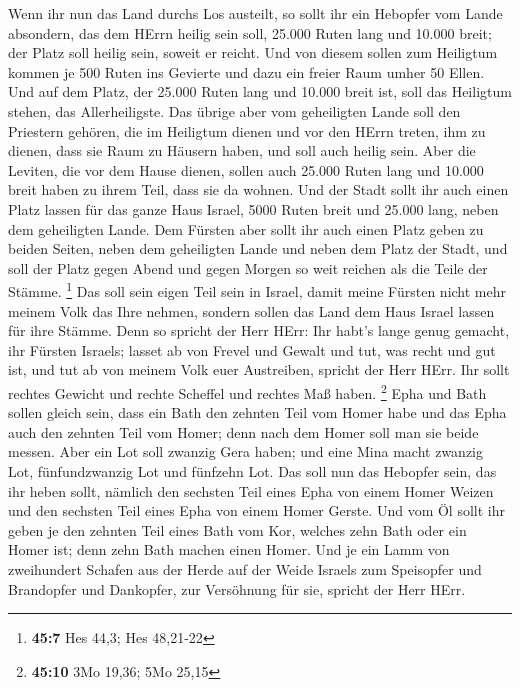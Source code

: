  Wenn ihr nun das Land durchs Los austeilt, so sollt ihr
ein Hebopfer vom Lande absondern, das dem HErrn heilig sein soll, 25.000
Ruten lang und 10.000 breit; der Platz soll heilig sein, soweit er
reicht.  Und von diesem sollen zum Heiligtum kommen je 500
Ruten ins Gevierte und dazu ein freier Raum umher 50 Ellen.
 Und auf dem Platz, der 25.000 Ruten lang und 10.000 breit
ist, soll das Heiligtum stehen, das Allerheiligste.  Das
übrige aber vom geheiligten Lande soll den Priestern gehören, die im
Heiligtum dienen und vor den HErrn treten, ihm zu dienen, dass sie Raum
zu Häusern haben, und soll auch heilig sein.  Aber die
Leviten, die vor dem Hause dienen, sollen auch 25.000 Ruten lang und
10.000 breit haben zu ihrem Teil, dass sie da wohnen.  Und
der Stadt sollt ihr auch einen Platz lassen für das ganze Haus Israel,
5000 Ruten breit und 25.000 lang, neben dem geheiligten Lande.
 Dem Fürsten aber sollt ihr auch einen Platz geben zu
beiden Seiten, neben dem geheiligten Lande und neben dem Platz der
Stadt, und soll der Platz gegen Abend und gegen Morgen so weit reichen
als die Teile der Stämme. \footnote{\textbf{45:7} Hes 44,3; Hes 48,21-22}
 Das soll sein eigen Teil sein in Israel, damit meine
Fürsten nicht mehr meinem Volk das Ihre nehmen, sondern sollen das Land
dem Haus Israel lassen für ihre Stämme.  Denn so spricht
der Herr HErr: Ihr habt's lange genug gemacht, ihr Fürsten Israels;
lasset ab von Frevel und Gewalt und tut, was recht und gut ist, und tut
ab von meinem Volk euer Austreiben, spricht der Herr HErr.
 Ihr sollt rechtes Gewicht und rechte Scheffel und
rechtes Maß haben. \footnote{\textbf{45:10} 3Mo 19,36; 5Mo 25,15}
 Epha und Bath sollen gleich sein, dass ein Bath den
zehnten Teil vom Homer habe und das Epha auch den zehnten Teil vom
Homer; denn nach dem Homer soll man sie beide messen. 
Aber ein Lot soll zwanzig Gera haben; und eine Mina macht zwanzig Lot,
fünfundzwanzig Lot und fünfzehn Lot.  Das soll nun das
Hebopfer sein, das ihr heben sollt, nämlich den sechsten Teil eines Epha
von einem Homer Weizen und den sechsten Teil eines Epha von einem Homer
Gerste.  Und vom Öl sollt ihr geben je den zehnten Teil
eines Bath vom Kor, welches zehn Bath oder ein Homer ist; denn zehn Bath
machen einen Homer.  Und je ein Lamm von zweihundert
Schafen aus der Herde auf der Weide Israels zum Speisopfer und
Brandopfer und Dankopfer, zur Versöhnung für sie, spricht der Herr HErr.
